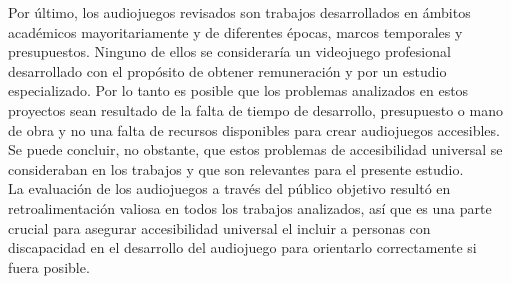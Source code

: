 Por último, los audiojuegos revisados son trabajos desarrollados en ámbitos académicos mayoritariamente y de diferentes épocas, marcos temporales y presupuestos. Ninguno de ellos se consideraría un videojuego profesional desarrollado con el propósito de obtener remuneración y por un estudio especializado. Por lo tanto es posible que los problemas analizados en estos proyectos sean resultado de la falta de tiempo de desarrollo, presupuesto o mano de obra y no una falta de recursos disponibles para crear audiojuegos accesibles. Se puede concluir, no obstante, que estos problemas de accesibilidad universal se consideraban en los trabajos y que son relevantes para el presente estudio. \\

La evaluación de los audiojuegos a través del público objetivo resultó en retroalimentación valiosa en todos los trabajos analizados, así que es una parte crucial para asegurar accesibilidad universal el incluir a personas con discapacidad en el desarrollo del audiojuego para orientarlo correctamente si fuera posible.

